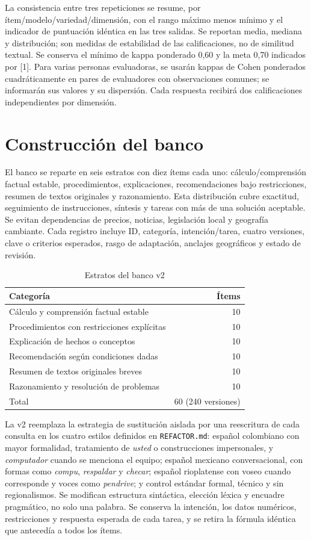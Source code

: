 \documentclass[conference]{IEEEtran}
\begin{document}
La consistencia entre tres repeticiones se resume, por ítem/modelo/variedad/dimensión, con el rango máximo menos mínimo y el indicador de puntuación idéntica en las tres salidas. Se reportan media, mediana y distribución; son medidas de estabilidad de las calificaciones, no de similitud textual. Se conserva el mínimo de kappa ponderado 0,60 y la meta 0,70 indicados por [1]. Para varias personas evaluadoras, se usarán kappas de Cohen ponderados cuadráticamente en pares de evaluadores con observaciones comunes; se informarán sus valores y su dispersión. Cada respuesta recibirá dos calificaciones independientes por dimensión.

\section{Construcción del banco}
El banco se reparte en seis estratos con diez ítems cada uno: cálculo/comprensión factual estable, procedimientos, explicaciones, recomendaciones bajo restricciones, resumen de textos originales y razonamiento. Esta distribución cubre exactitud, seguimiento de instrucciones, síntesis y tareas con más de una solución aceptable. Se evitan dependencias de precios, noticias, legislación local y geografía cambiante. Cada registro incluye ID, categoría, intención/tarea, cuatro versiones, clave o criterios esperados, rasgo de adaptación, anclajes geográficos y estado de revisión.

\begin{table}[!ht]
\caption{Estratos del banco v2}
\centering
\begin{tabular}{lr}
\toprule
Categoría & Ítems \\
\midrule
Cálculo y comprensión factual estable & 10 \\
Procedimientos con restricciones explícitas & 10 \\
Explicación de hechos o conceptos & 10 \\
Recomendación según condiciones dadas & 10 \\
Resumen de textos originales breves & 10 \\
Razonamiento y resolución de problemas & 10 \\
\midrule
Total & 60 (240 versiones) \\
\bottomrule
\end{tabular}
\end{table}

La v2 reemplaza la estrategia de sustitución aislada por una reescritura de cada consulta en los cuatro estilos definidos en \texttt{REFACTOR.md}: español colombiano con mayor formalidad, tratamiento de \textit{usted} o construcciones impersonales, y \textit{computador} cuando se menciona el equipo; español mexicano conversacional, con formas como \textit{compu}, \textit{respaldar} y \textit{checar}; español rioplatense con voseo cuando corresponde y voces como \textit{pendrive}; y control estándar formal, técnico y sin regionalismos. Se modifican estructura sintáctica, elección léxica y encuadre pragmático, no solo una palabra. Se conserva la intención, los datos numéricos, restricciones y respuesta esperada de cada tarea, y se retira la fórmula idéntica que antecedía a todos los ítems.
\end{document}
